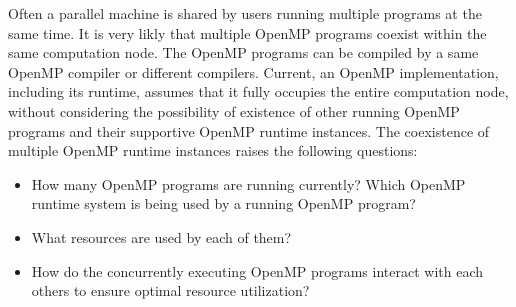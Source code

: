 Often a parallel machine is shared by users running multiple programs at the same time.
It is very likly that multiple OpenMP programs coexist within the same computation node. 
The OpenMP programs can be compiled by a same OpenMP compiler or different compilers. 
Current, an OpenMP implementation, including its runtime, assumes that it fully occupies the entire computation node,
without considering the possibility of existence of other running OpenMP programs and their supportive OpenMP runtime instances. 
The coexistence of multiple OpenMP runtime instances raises the following questions:
\begin{itemize}
\item How many OpenMP programs are running currently?
\itme Which OpenMP runtime system is being used by a running OpenMP program?
\item What resources are used by each of them?
\item How do the concurrently executing OpenMP programs interact with each others to ensure optimal resource utilization?
\end{itemize}
